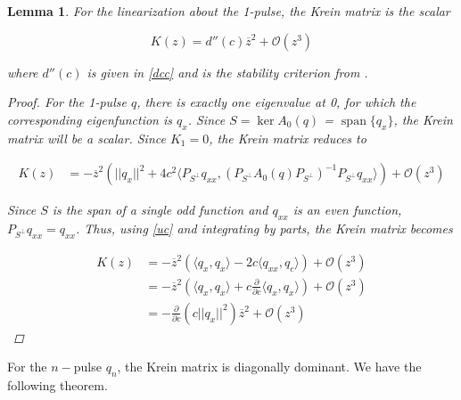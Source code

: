 \documentclass[12pt]{article}
\DeclareMathOperator{\spn}{span}
\newtheorem{lemma}{Lemma}
\begin{document}

\begin{lemma}\label{Krein1pulse}
For the linearization about the 1-pulse, the Krein matrix is the scalar

\begin{equation}
K(z) = d''(c) \overline{z}^2 + \mathcal{O}(z^3)
\end{equation}

where $d''(c)$ is given in \eqref{dcc} and is the stability criterion from \cite{Grillakis1987}.

\begin{proof}
For the 1-pulse $q$, there is exactly one eigenvalue at 0, for which the corresponding eigenfunction is $q_x$. Since $S = \ker A_0(q)$ = $\spn \{q_x\}$, the Krein matrix will be a scalar. Since $K_1 = 0$, the Krein matrix reduces to 

\begin{align*}
K(z) &= -\overline{z}^2 \left( ||q_x||^2 + 4 c^2 \langle P_{S^\perp} q_{xx}, (P_{S^\perp} A_0(q) P_{S^\perp})^{-1} P_{S^\perp} q_{xx} \rangle \right) + \mathcal{O}(z^3)
\end{align*}

Since $S$ is the span of a single odd function and $q_{xx}$ is an even function, $P_{S^\perp} q_{xx} = q_{xx}$. Thus, using \eqref{uc} and integrating by parts, the Krein matrix becomes

\begin{align*}
K(z) &= -\overline{z}^2 \left( \langle q_x, q_x \rangle - 2c \langle q_{xx}, q_c \rangle \right) + \mathcal{O}(z^3) \\
&= -\overline{z}^2 \left( \langle q_x, q_x \rangle + c \frac{\partial}{\partial c}\langle q_x, q_x \rangle \right) + \mathcal{O}(z^3)  \\
&= -\frac{\partial}{\partial c} \left( c||q_x||^2 \right) \overline{z}^2  + \mathcal{O}(z^3) 
\end{align*}

\end{proof}
\end{lemma}

For the $n-$pulse $q_n$, the Krein matrix is diagonally dominant. We have the following theorem.

\end{document}
